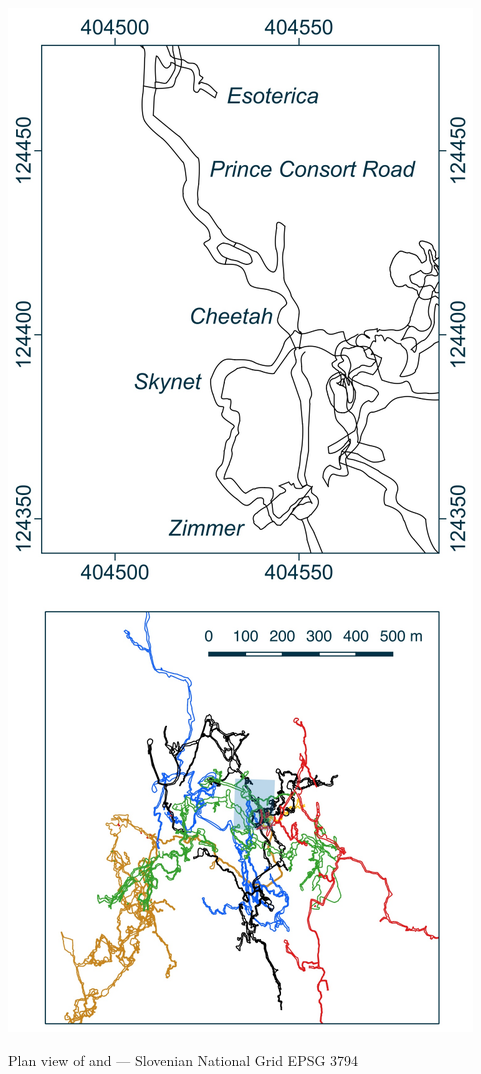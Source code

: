 \begin{marginfigure}
	\includegraphics[width= \linewidth]{images/little_insets/esoterica_inset.pdf}
	\caption*{Plan view of \protect{} and \protect{}--- Slovenian National Grid EPSG 3794}
	\label{Prince Consort Road}
\end{marginfigure}

